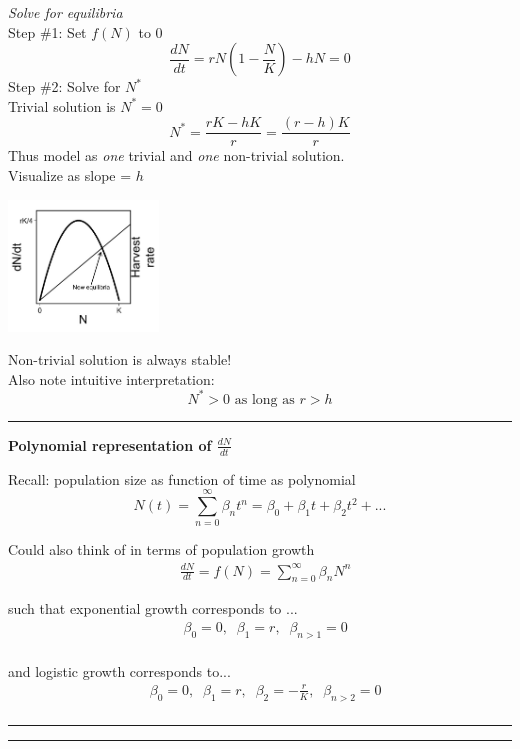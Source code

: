 \documentclass{article}
\newcommand{\ind}{\-\hspace{1cm}}
\begin{document}
\emph{Solve for equilibria}\\
Step \#1: Set $f(N)$ to $0$
\begin{equation*}
	\frac{dN}{dt}=rN\left(1-\frac{N}{K}\right)-hN=0
\end{equation*}
Step \#2: Solve for $N^*$\\
\ind Trivial solution is $N^*=0$
\begin{equation*}
	N^*=\frac{rK-hK}{r}=\frac{(r-h)K}{r}
\end{equation*}
Thus model as \emph{one} trivial and \emph{one} non-trivial solution.\\
Visualize as slope = $h$
\begin{center}
\includegraphics[width=4cm]{figs/dNdt_harvesteffort.jpg}
\end{center}
Non-trivial solution is always stable!\\
Also note intuitive interpretation:\\
\begin{equation*}
	N^*>0 \text{ as long as } r>h
\end{equation*}

\rule[0.5ex]{\linewidth}{1pt}

\pagebreak 

\textbf{Polynomial representation of $\frac{dN}{dt}$}

Recall: population size as function of time as polynomial
\begin{equation*}
	N(t)=\sum_{n=0}^\infty \beta_n t^n = \beta_0 + \beta_1 t + \beta_2 t^2 +...
\end{equation*}


Could also think of in terms of population growth 
\begin{align*}
&	\frac{dN}{dt}=f(N)=\sum_{n=0}^\infty \beta_n N^n
\end{align*}

such that exponential growth corresponds to ...
\begin{align*}
& 	\beta_0=0, \;\; \beta_1 = r, \;\; \beta_{n>1}=0\\
\end{align*}

and logistic growth corresponds to...
\begin{align*}
& 	\beta_0=0, \;\; \beta_1 = r, \;\; \beta_2 = -\frac{r}{K}, \;\; \beta_{n>2}=0\\
\end{align*}

\rule[0.5ex]{\linewidth}{1pt}
\rule[0.5ex]{\linewidth}{1pt}
\end{document}
